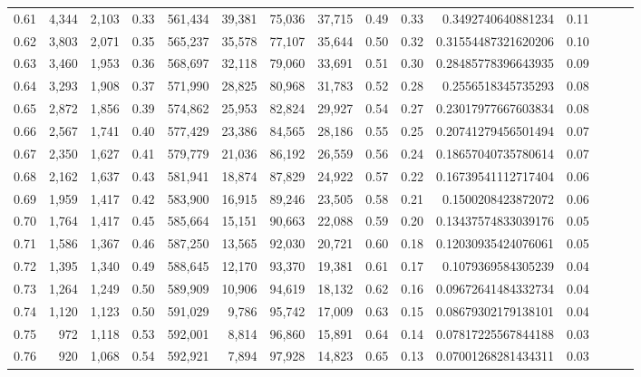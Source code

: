 \begin{tabular}{rrrrrrrrrrrrrrr}
0.61 &   4,344 &  2,103 &  0.33 &  561,434 &   39,381 &   75,036 &   37,715 &  0.49 &  0.33 &     0.3492740640881234 &      0.11 \\
0.62 &   3,803 &  2,071 &  0.35 &  565,237 &   35,578 &   77,107 &   35,644 &  0.50 &  0.32 &    0.31554487321620206 &      0.10 \\
0.63 &   3,460 &  1,953 &  0.36 &  568,697 &   32,118 &   79,060 &   33,691 &  0.51 &  0.30 &    0.28485778396643935 &      0.09 \\
0.64 &   3,293 &  1,908 &  0.37 &  571,990 &   28,825 &   80,968 &   31,783 &  0.52 &  0.28 &     0.2556518345735293 &      0.08 \\
0.65 &   2,872 &  1,856 &  0.39 &  574,862 &   25,953 &   82,824 &   29,927 &  0.54 &  0.27 &    0.23017977667603834 &      0.08 \\
0.66 &   2,567 &  1,741 &  0.40 &  577,429 &   23,386 &   84,565 &   28,186 &  0.55 &  0.25 &    0.20741279456501494 &      0.07 \\
0.67 &   2,350 &  1,627 &  0.41 &  579,779 &   21,036 &   86,192 &   26,559 &  0.56 &  0.24 &    0.18657040735780614 &      0.07 \\
0.68 &   2,162 &  1,637 &  0.43 &  581,941 &   18,874 &   87,829 &   24,922 &  0.57 &  0.22 &    0.16739541112717404 &      0.06 \\
0.69 &   1,959 &  1,417 &  0.42 &  583,900 &   16,915 &   89,246 &   23,505 &  0.58 &  0.21 &     0.1500208423872072 &      0.06 \\
0.70 &   1,764 &  1,417 &  0.45 &  585,664 &   15,151 &   90,663 &   22,088 &  0.59 &  0.20 &    0.13437574833039176 &      0.05 \\
0.71 &   1,586 &  1,367 &  0.46 &  587,250 &   13,565 &   92,030 &   20,721 &  0.60 &  0.18 &    0.12030935424076061 &      0.05 \\
0.72 &   1,395 &  1,340 &  0.49 &  588,645 &   12,170 &   93,370 &   19,381 &  0.61 &  0.17 &     0.1079369584305239 &      0.04 \\
0.73 &   1,264 &  1,249 &  0.50 &  589,909 &   10,906 &   94,619 &   18,132 &  0.62 &  0.16 &    0.09672641484332734 &      0.04 \\
0.74 &   1,120 &  1,123 &  0.50 &  591,029 &    9,786 &   95,742 &   17,009 &  0.63 &  0.15 &    0.08679302179138101 &      0.04 \\
0.75 &     972 &  1,118 &  0.53 &  592,001 &    8,814 &   96,860 &   15,891 &  0.64 &  0.14 &    0.07817225567844188 &      0.03 \\
0.76 &     920 &  1,068 &  0.54 &  592,921 &    7,894 &   97,928 &   14,823 &  0.65 &  0.13 &    0.07001268281434311 &      0.03 \\

\end{tabular}
